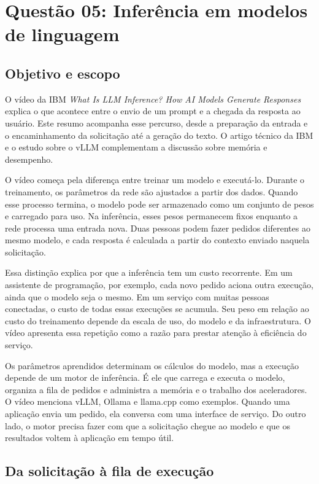 \documentclass[12pt,a4paper]{article}
\begin{document}
\section{Questão 05: Inferência em modelos de linguagem}

\subsection{Objetivo e escopo}

O vídeo da IBM \textit{What Is LLM Inference? How AI Models Generate Responses} explica o que acontece entre o envio de um prompt e a chegada da resposta ao usuário. Este resumo acompanha esse percurso, desde a preparação da entrada e o encaminhamento da solicitação até a geração do texto. O artigo técnico da IBM e o estudo sobre o vLLM complementam a discussão sobre memória e desempenho.

O vídeo começa pela diferença entre treinar um modelo e executá-lo. Durante o treinamento, os parâmetros da rede são ajustados a partir dos dados. Quando esse processo termina, o modelo pode ser armazenado como um conjunto de pesos e carregado para uso. Na inferência, esses pesos permanecem fixos enquanto a rede processa uma entrada nova. Duas pessoas podem fazer pedidos diferentes ao mesmo modelo, e cada resposta é calculada a partir do contexto enviado naquela solicitação.

Essa distinção explica por que a inferência tem um custo recorrente. Em um assistente de programação, por exemplo, cada novo pedido aciona outra execução, ainda que o modelo seja o mesmo. Em um serviço com muitas pessoas conectadas, o custo de todas essas execuções se acumula. Seu peso em relação ao custo do treinamento depende da escala de uso, do modelo e da infraestrutura. O vídeo apresenta essa repetição como a razão para prestar atenção à eficiência do serviço.

Os parâmetros aprendidos determinam os cálculos do modelo, mas a execução depende de um motor de inferência. É ele que carrega e executa o modelo, organiza a fila de pedidos e administra a memória e o trabalho dos aceleradores. O vídeo menciona vLLM, Ollama e llama.cpp como exemplos. Quando uma aplicação envia um pedido, ela conversa com uma interface de serviço. Do outro lado, o motor precisa fazer com que a solicitação chegue ao modelo e que os resultados voltem à aplicação em tempo útil.

\subsection{Da solicitação à fila de execução}
\end{document}
